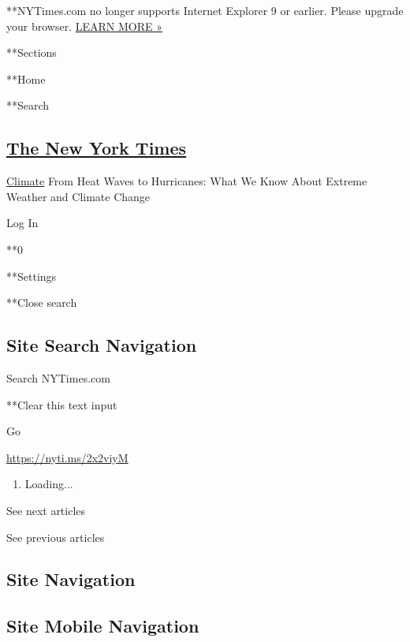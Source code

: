  **NYTimes.com no longer supports Internet Explorer 9 or earlier. Please
upgrade your browser.
\href{http://www.nytimes3xbfgragh.onion/content/help/site/ie9-support.html}{LEARN
MORE »}

**Sections

**Home

**Search

\hypertarget{the-new-york-times}{%
\subsection{\texorpdfstring{\href{http://www.nytimes3xbfgragh.onion/}{The
New York Times}}{The New York Times}}\label{the-new-york-times}}

 \href{/section/climate}{Climate} \textbar{}From Heat Waves to
Hurricanes: What We Know About Extreme Weather and Climate Change

Log In

**0

**Settings

**Close search

\hypertarget{site-search-navigation}{%
\subsection{Site Search Navigation}\label{site-search-navigation}}

Search NYTimes.com

**Clear this text input

Go

\url{https://nyti.ms/2x2viyM}

\begin{enumerate}
\def\labelenumi{\arabic{enumi}.}
\item
  Loading...
\end{enumerate}

See next articles

See previous articles

\hypertarget{site-navigation}{%
\subsection{Site Navigation}\label{site-navigation}}

\hypertarget{site-mobile-navigation}{%
\subsection{Site Mobile Navigation}\label{site-mobile-navigation}}


